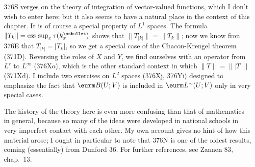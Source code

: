 {376S verges on the theory of integration of vector-valued functions,
which I don't wish to enter here;  but it also seems to have a natural
place in the context of this chapter.   It is of course a special
property of $L^1$ spaces.   The formula
$\|T_k\|=\esssup_x\tau(k_x^{\ssbullet})$ shows that
$\|T_{|k|}\|=\|T_k\|$;
now we know fron 376E that $T_{|k|}=|T_k|$, so we get a special case of
the Chacon-Krengel theorem (371D).   Reversing the roles of $X$ and
$Y$, we find ourselves with an operator from $L^{\tau}$ to $L^{\infty}$
(376Xo), which is the other standard context in which $\|T\|=\||T|\|$
(371Xd).   I include two exercises on $L^2$ spaces (376Xj, 376Yi)
designed to emphasize the fact that $\eurm B(U;V)$ is included in
$\eurm L^{\sim}(U;V)$ only in very special cases.

The history of the theory here is even more confusing than that of
mathematics in general, because so many of the ideas were developed in
national schools in very imperfect contact with each other.   My own
account gives no hint of how this material arose;  I ought in
particular to note that 376N is one of the oldest results, coming
(essentially) from {\smc Dunford 36}.   For further references,
see {\smc Zaanen 83}, chap.\ 13.
}%

\discrpage


